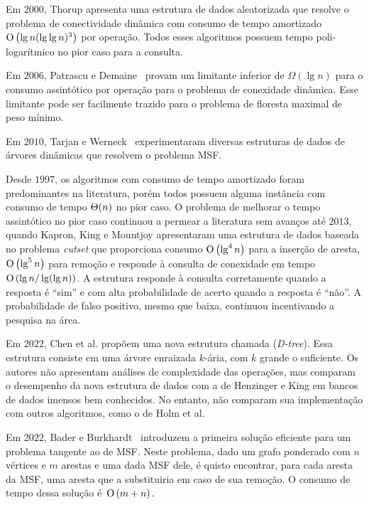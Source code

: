 Em $2000$, Thorup \cite{Thorup2000} apresenta uma estrutura de dados aleatorizada que resolve o problema de conectividade dinâmica com consumo de tempo amortizado $\text{O}\left(\lg n(\lg\lg n)^3\right)$ por operação. Todos esses algoritmos possuem tempo poli-logarítmico no pior caso para a consulta.

Em $2006$, Patrascu e Demaine~\cite{lowerBoundPatrascu} provam um limitante inferior de $\Omega(\lg n)$ para o consumo assintótico por operação para o problema de conexidade dinâmica. Esse limitante pode ser facilmente trazido para o problema de floresta maximal de peso mínimo.

Em $2010$, Tarjan e Werneck~\cite{tarjanWerneck2010} experimentaram diversas estruturas de dados de árvores dinâmicas que resolvem o problema MSF.


Desde $1997$, os algoritmos com consumo de tempo amortizado foram predominantes na literatura, porém todos possuem alguma instância com consumo de tempo $\Theta(n)$ no pior caso. O problema de melhorar o tempo assintótico no pior caso continuou a permear a literatura sem avanços até $2013$, quando Kapron, King e Mountjoy \cite{bruceM} apresentaram uma estrutura de dados baseada no problema \textit{cutset} que proporciona consumo $\text{O}\left(\lg^4 n\right)$ para a inserção de aresta, $\text{O}\left(\lg^5 n\right)$ para remoção e responde à consulta de conexidade em tempo $\text{O}\left(\lg n / \lg(\lg n)\right)$. A estrutura responde à consulta corretamente quando a resposta é “sim” e com alta probabilidade de acerto quando a resposta é “não”. A probabilidade de falso positivo, mesmo que baixa, continuou incentivando a pesquisa na área. 


Em $2022$, Chen et al. \cite{QC22} propõem uma nova estrutura chamada  (\textit{D-tree}). Essa estrutura consiste em uma árvore enraizada $k$-ária, com $k$ grande o suficiente. Os autores não apresentam análises de complexidade das operações, mas comparam o desempenho da nova estrutura de dados com a de Henzinger e King em bancos de dados imensos bem conhecidos. No entanto, não comparam sua implementação com outros algoritmos, como o de Holm et al.

Em $2022$, Bader e Burkhardt~\cite{simpleAndEfficient2022} introduzem a primeira solução eficiente para um problema tangente ao de MSF. Neste problema, dado um grafo ponderado com $n$ vértices e $m$ arestas e uma dada MSF dele, é quisto encontrar, para cada aresta da MSF, uma aresta que a substituiria em caso de sua remoção. O consumo de tempo dessa solução é~$\text{O}\left(m+n\right)$.




